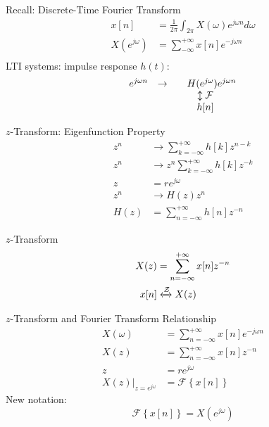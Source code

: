 \begin{frame}{Recall: Discrete-Time Fourier Transform}
    \begin{align*}
        x[n] &= \frac{1}{2\pi}\int_{2\pi}X(\omega)e^{j\omega n}d\omega\\
        X(e^{j\omega}) &= \sum_{-\infty}^{+\infty}x[n]e^{-j\omega n}\\
    \end{align*}
    LTI systems: impulse response $h(t)$:
    \begin{equation*}
        \begin{matrix}
            e^{j\omega n} & \rightarrow & \quad H(e^{j\omega})e^{j\omega n} \\
            && \negthickspace\updownarrow{\mathcal{F}}\\
            && \negthickspace h[n]\\
        \end{matrix}
    \end{equation*}
\end{frame}


\begin{frame}{$z$-Transform: Eigenfunction Property}
    \begin{align*}
        z^{n} &\rightarrow \sum_{k=-\infty}^{+\infty}h[k]z^{n-k}\\
        z^{n} &\rightarrow z^{n}\sum_{k=-\infty}^{+\infty}h[k]z^{-k}\\
        z &= re^{j\omega}\\
        z^{n}   &\rightarrow H(z) z^{n}\\
        H(z) &= \sum_{n=-\infty}^{+\infty}h[n]z^{-n}
    \end{align*}
\end{frame}


\begin{frame}{$z$-Transform}
    \begin{align*}
        X(z) &= \sum_{n=-\infty}^{+\infty}x[n]z^{-n}\\
        x[n] &\xleftrightarrow{\mathcal{Z}} X(z)
    \end{align*}
\end{frame}


\begin{frame}{$z$-Transform and Fourier Transform Relationship}
    \begin{align*}
        X(\omega) &= \sum_{n=-\infty}^{+\infty}x[n]e^{-j\omega n}\\
        X(z) &= \sum_{n=-\infty}^{+\infty}x[n]z^{-n}\\
        z &= re^{j\omega}\\
        \left.X(z)\right|_{z=e^{j\omega}} &= \mathcal{F}\left\{ x[n]\right\}
    \end{align*}
    New notation:
    \begin{equation*}
        \mathcal{F}\left\{ x[n]\right\} = X(e^{j\omega})
    \end{equation*}
\end{frame}

